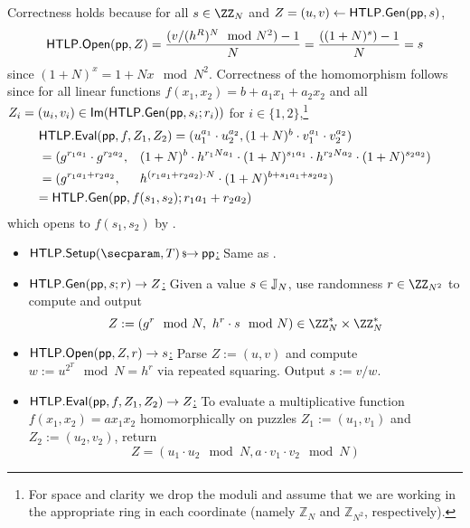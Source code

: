 \noindent Correctness holds because for all $s \in \ZZ_N$ and $Z = (u,v) \gets \mathsf{HTLP}.{\sf Gen}(\mathsf{pp}, s)$,
\begin{equation}\label{eq:correctness1}
\mathsf{HTLP}.\mathsf{Open}(\mathsf{pp}, Z) = \frac{(v/(h^R)^N \mod{N^2})-1}{N} = \frac{((1+N)^s) - 1}{N} = s
\end{equation}
since $(1+N)^x = 1+Nx \mod{N^2}$.
Correctness of the homomorphism follows since for all linear functions $f(x_1, x_2) = b + a_1 x_1 + a_2 x_2$ and all $Z_i = (u_i, v_i) \in {\sf Im}(\mathsf{HTLP}.{\sf Gen}(\mathsf{pp}, s_i; r_i))$ for $i \in \{1,2\}$,\footnote{For space and clarity we drop the moduli and assume that we are working in the appropriate ring in each coordinate (namely $\mathbb{Z}_N$ and $\mathbb{Z}_{N^2}$, respectively).}
\begin{align*}
&\htlp\rlap{$.{\sf Eval}(\pparam, f, Z_1, Z_2) = (u_1^{a_1} \cdot u_2^{a_2}, (1+N)^b \cdot v_1^{a_1} \cdot v_2^{a_2})$} && \\
&= (g^{r_1 a_1} \cdot g^{r_2 a_2}, &&(1+N)^b \cdot h^{r_1 N a_1} \cdot (1+N)^{s_1 a_1} \cdot h^{r_2 N a_2} \cdot (1+N)^{s_2 a_2})\\
&= (g^{r_1 a_1 + r_2 a_2},         &&h^{(r_1 a_1 + r_2 a_2) \cdot N} \cdot (1+N)^{b + s_1 a_1 + s_2 a_2}) \\
&\rlap{$= \htlp.{\sf Gen}(\pparam, f(s_1, s_2); r_1 a_1 + r_2 a_2)$} &&
\end{align*}
which opens to $f(s_1, s_2)$ by .


    \begin{construction}\label{con:multHTLP}
    \hfill
    \begin{itemize}
        \item \underline{$\htlp.\Setup(\secparam, \Ttime) \randout \pparam$:} Same as .
        \item \underline{$\mathsf{HTLP}.{\sf Gen}(\mathsf{pp}, s; r) \rightarrow Z$:} Given a value $s \in \mathbb{J}_N$, use randomness $r \in \ZZ_{N^2}$ to compute and output
            $$Z := (g^r \mod{N},\ h^r \cdot s \mod{N}) \in \ZZ_N^* \times \ZZ_N^*$$
        \item \underline{$\mathsf{HTLP}.\mathsf{Open}(\mathsf{pp}, Z, r) \rightarrow s$:} Parse $Z := (u,v)$ and compute $w := u^{2^T} \mod{N} \allowbreak= h^r$ via repeated squaring. Output $s := v/w$.
        \item \underline{$\mathsf{HTLP}.{\sf Eval}(\mathsf{pp}, f, Z_1, Z_2) \rightarrow Z$:} To evaluate a multiplicative function $f(x_1, x_2) \allowbreak= a x_1 x_2$ homomorphically on puzzles $Z_1 := (u_1, v_1)$ and $Z_2 := (u_2, v_2)$, return
        $$Z = (u_1 \cdot u_2 \mod{N}, a \cdot v_1 \cdot v_2 \mod{N})$$
    \end{itemize}
    \end{construction}

